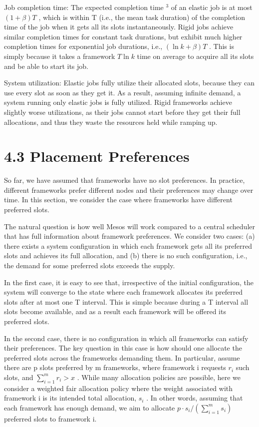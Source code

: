 \documentclass[
]{article}
\begin{document}
Job completion time: The expected completion time \(^{3}\) of an elastic
job is at most \((1 + \beta)T\) , which is within T (i.e., the mean task
duration) of the completion time of the job when it gets all its slots
instantaneously. Rigid jobs achieve similar completion times for
constant task durations, but exhibit much higher completion times for
exponential job durations, i.e., \((\ln k + \beta)T\) . This is simply
because it takes a framework \(T \ln k\) time on average to acquire all
its slots and be able to start its job.

System utilization: Elastic jobs fully utilize their allocated slots,
because they can use every slot as soon as they get it. As a result,
assuming infinite demand, a system running only elastic jobs is fully
utilized. Rigid frameworks achieve slightly worse utilizations, as their
jobs cannot start before they get their full allocations, and thus they
waste the resources held while ramping up.

\section{4.3 Placement Preferences}\label{placement-preferences}

So far, we have assumed that frameworks have no slot preferences. In
practice, different frameworks prefer different nodes and their
preferences may change over time. In this section, we consider the case
where frameworks have different preferred slots.

The natural question is how well Mesos will work compared to a central
scheduler that has full information about framework preferences. We
consider two cases: (a) there exists a system configuration in which
each framework gets all its preferred slots and achieves its full
allocation, and (b) there is no such configuration, i.e., the demand for
some preferred slots exceeds the supply.

In the first case, it is easy to see that, irrespective of the initial
configuration, the system will converge to the state where each
framework allocates its preferred slots after at most one T interval.
This is simple because during a T interval all slots become available,
and as a result each framework will be offered its preferred slots.

In the second case, there is no configuration in which all frameworks
can satisfy their preferences. The key question in this case is how
should one allocate the preferred slots across the frameworks demanding
them. In particular, assume there are p slots preferred by m frameworks,
where framework i requests \(r_{i}\) such slots, and
\(\sum_{i=1}^{m} r_{i} > x\) . While many allocation policies are
possible, here we consider a weighted fair allocation policy where the
weight associated with framework i is its intended total allocation,
\(s_{i}\) . In other words, assuming that each framework has enough
demand, we aim to allocate \(p \cdot s_{i} / (\sum_{i=1}^{m} s_{i})\)
preferred slots to framework i.
\end{document}
